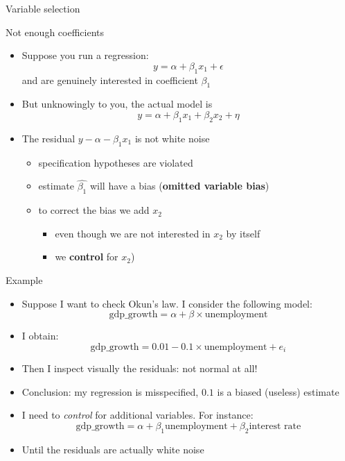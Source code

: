 \documentclass[
  ignorenonframetext,
  aspectratio=169,
]{beamer}
\providecommand{\tightlist}{%
  \setlength{\itemsep}{0pt}\setlength{\parskip}{0pt}}\usepackage{longtable,booktabs,array}
\begin{document}
\begin{frame}{Variable selection}
\begin{block}{Not enough coefficients}
\protect\hypertarget{not-enough-coefficients}{}
\begin{itemize}
\tightlist
\item
  Suppose you run a regression: \[y = \alpha + \beta_1 x_1 + \epsilon\]
  and are genuinely interested in coefficient \(\beta_1\)
\item
  But unknowingly to you, the actual model is
  \[y = \alpha + \beta_1 x_1 + \beta_2 x_2 + \eta\]
\item
  The residual \(y - \alpha - \beta_1 x_1\) is not white noise

  \begin{itemize}
  \tightlist
  \item
    specification hypotheses are violated
  \item
    estimate \(\hat{\beta_1}\) will have a bias (\textbf{omitted
    variable bias})
  \item
    to correct the bias we add \(x_2\)

    \begin{itemize}
    \tightlist
    \item
      even though we are not interested in \(x_2\) by itself
    \item
      we \textbf{control} for \(x_2\))
    \end{itemize}
  \end{itemize}
\end{itemize}
\end{block}

\begin{block}{Example}
\protect\hypertarget{example}{}
\begin{itemize}[<+->]
\tightlist
\item
  Suppose I want to check Okun's law. I consider the following model:
  \[\text{gdp_growth} = \alpha + \beta \times \text{unemployment}\]
\item
  I obtain:
  \[\text{gdp_growth} = 0.01 - 0.1 \times \text{unemployment} + e_i\]
\item
  Then I inspect visually the residuals: not normal at all!
\item
  Conclusion: my regression is misspecified, \(0.1\) is a biased
  (useless) estimate
\item
  I need to \emph{control} for additional variables. For instance:
  \[\text{gdp_growth} = \alpha + \beta_1 \text{unemployment} + \beta_2 \text{interest rate}\]
\item
  Until the residuals are actually white noise
\end{itemize}
\end{block}


\end{frame}
\end{document}
